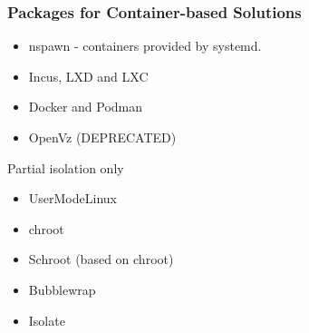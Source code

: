 \documentclass{beamer}
\begin{document}
\begin{frame}
\frametitle{Packages for Container-based Solutions}

\begin{itemize} 
 \item nspawn - containers provided by systemd. 
 \item Incus, LXD and LXC
 \item Docker and Podman
 \item OpenVz (DEPRECATED)
\end{itemize}

Partial isolation only

\begin{itemize}
 \item UserModeLinux
 \item chroot
 \item Schroot (based on chroot)
 \item Bubblewrap
 \item Isolate
\end{itemize}
\end{frame}
\end{document}
